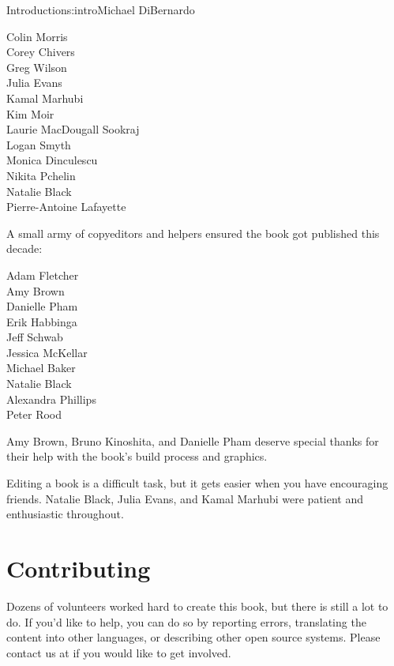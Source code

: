 \begin{aosachapter}{Introduction}{s:intro}{Michael DiBernardo}
\begin{multicols}{3}
\noindent Colin Morris \\
Corey Chivers \\
Greg Wilson \\
Julia Evans \\
Kamal Marhubi \\
Kim Moir \\
Laurie MacDougall Sookraj \\
Logan Smyth \\
Monica Dinculescu \\
Nikita Pchelin \\
Natalie Black \\
Pierre-Antoine Lafayette \\
\end{multicols}

\newpage  %

\noindent A small army of copyeditors and helpers ensured the book got published this decade:

\begin{multicols}{3}
\noindent Adam Fletcher \\
Amy Brown \\
Danielle Pham \\
Erik Habbinga \\
Jeff Schwab  \\
Jessica McKellar \\
Michael Baker \\
Natalie Black \\
Alexandra Phillips \\
Peter Rood
\end{multicols}

Amy Brown, Bruno Kinoshita, and Danielle Pham deserve special thanks
for their help with the book's build process and graphics.

Editing a book is a difficult task,
but it gets easier when you have encouraging friends.
Natalie Black, Julia Evans, and Kamal Marhubi were patient and enthusiastic throughout.

\section*{Contributing}


Dozens of volunteers worked hard to create this book,
but there is still a lot to do.
If you'd like to help,
you can do so by reporting errors,
translating the content into other languages,
or describing other open source systems.
Please contact us at  if you would like to get involved.

\end{aosachapter}
